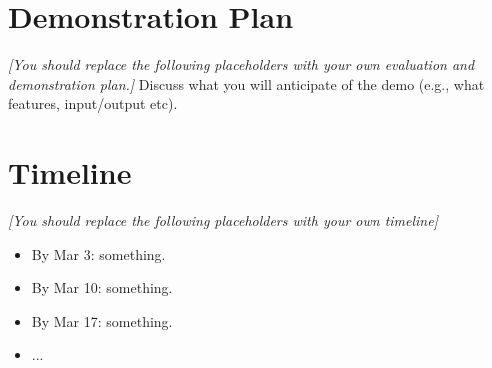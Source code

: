 \documentclass[10pt,twocolumn,letterpaper]{article}
\newcommand{\note}[1]{{\it\color{red} #1}}
\begin{document}

\section{Demonstration Plan}
\label{sec:evaluation}

\note{[You should replace the following placeholders with your own evaluation and demonstration plan.]} Discuss what you will anticipate of the demo (e.g., what features, input/output etc). 

\section{Timeline}
\label{sec:timeline}
\cite{clouse1992teaching}
\note{[You should replace the following placeholders with your own timeline]}
\begin{itemize}
    \item By Mar 3: something.
    \item By Mar 10: something.
    \item By Mar 17: something.
    \item ...
\end{itemize}


{\small


}
\end{document}
